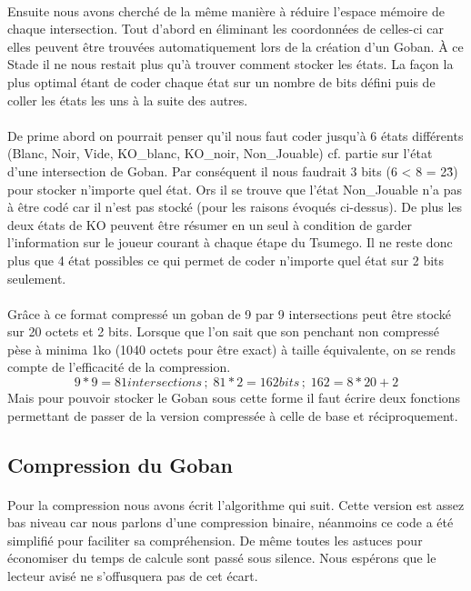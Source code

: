             \paragraph{}Ensuite nous avons cherché de la même manière à réduire l’espace mémoire de chaque intersection. Tout d’abord en éliminant les coordonnées de celles-ci car elles peuvent être trouvées automatiquement lors de la création d’un Goban. À ce Stade il ne nous restait plus qu’à trouver comment stocker les états. La façon la plus optimal étant de coder chaque état sur un nombre de bits défini puis de coller les états les uns à la suite des autres. 
            
            \paragraph{}De prime abord on pourrait penser qu’il nous faut coder jusqu’à 6 états différents (Blanc, Noir, Vide, KO\_blanc, KO\_noir, Non\_Jouable) cf. partie sur l’état d’une intersection de Goban. Par conséquent il nous faudrait 3 bits (6 < 8 = 2\^3) pour stocker n’importe quel état. Ors il se trouve que l’état Non\_Jouable n’a pas à être codé car il n’est pas stocké (pour les raisons évoqués ci-dessus). De plus les deux états de KO peuvent être résumer en un seul à condition de garder l’information sur le joueur courant à chaque étape du Tsumego. Il ne reste donc plus que 4 état possibles ce qui permet de coder n’importe quel état sur 2 bits seulement.
            
            \paragraph{}Grâce à ce format compressé un goban de 9 par 9 intersections peut être stocké sur 20 octets et 2 bits. Lorsque que l’on sait que son penchant non compressé pèse à minima 1ko (1040 octets pour être exact) à taille équivalente, on se rends compte de l’efficacité de la compression.
            \[ 9 * 9 = 81 intersections \,;\; 81 * 2 = 162 bits \,;\; 162 = 8 * 20 + 2\]
            Mais pour pouvoir stocker le Goban sous cette forme il faut écrire deux fonctions permettant de passer de la version compressée à celle de base et réciproquement.


        \newpage
        \subsection{Compression du Goban}
            \paragraph{}Pour la compression nous avons écrit l’algorithme qui suit. Cette version est assez bas niveau car nous parlons d’une compression binaire, néanmoins ce code a été simplifié pour faciliter sa compréhension. De même toutes les astuces pour économiser du temps de calcule sont passé sous silence. Nous espérons que le lecteur avisé ne s’offusquera pas de cet écart.
            
